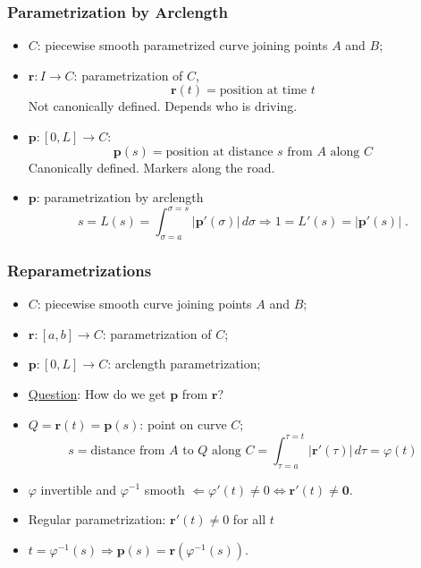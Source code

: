 \begin{frame}
  \frametitle{Parametrization by Arclength}

  \begin{itemize}
    \item $C$: piecewise smooth parametrized curve joining points $A$ and $B$;
    \item $\textbf{r} \colon I \to C$: parametrization of $C$,
    $$\textbf{r}(t) = \text{position at time }t$$
    Not canonically defined. Depends who is driving.
    \item $\textbf{p} \colon [0,L] \to C$:
    $$\textbf{p}(s) = \text{position at distance } s \text{ from }A \text{ along } C$$
    Canonically defined. Markers along the road.
    \item $\textbf{p}$: parametrization by arclength
    $$s=L(s) = \int_{\sigma=a}^{\sigma=s} |\textbf{p}'(\sigma)| \, d\sigma \Longrightarrow 1 = L'(s) = |\textbf{p}'(s)|\; .$$

  \end{itemize}
\end{frame}

\begin{frame}
  \frametitle{Reparametrizations}

  \begin{itemize}
    \item $C$: piecewise smooth curve joining points $A$ and $B$;
    \item $\textbf{r} \colon [a,b] \to C$: parametrization of $C$;
    \item $\textbf{p} \colon [0,L] \to C$: arclength parametrization;
    \item \underline{Question}: How do we get $\textbf{p}$ from $\textbf{r}$?
    \item $Q = \textbf{r}(t) = \textbf{p}(s)$: point on curve $C$;
    $$s = \text{distance from } A \text{ to } Q \text{ along } C = \int_{\tau=a}^{\tau=t} |\textbf{r}'(\tau)| \, d\tau = \varphi(t)$$
    \item $\varphi$ invertible and $\varphi^{-1}$ smooth $\Longleftarrow \varphi'(t) \neq 0 \Longleftrightarrow \textbf{r}'(t)\neq \textbf{0}$.
     \item Regular parametrization: $\textbf{r}'(t) \neq 0$ for all $t$
    \item $t=\varphi^{-1}(s) \Longrightarrow \textbf{p}(s) = \textbf{r}(\varphi^{-1}(s))$.
  \end{itemize}
\end{frame}

